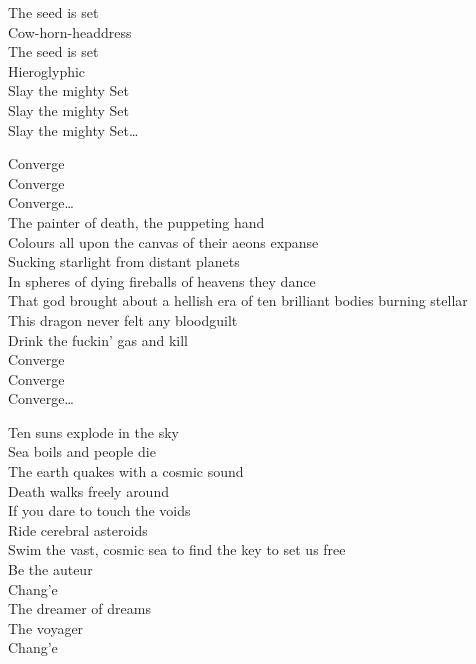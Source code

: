 The seed is set\\
Cow-horn-headdress\\
The seed is set\\
Hieroglyphic\\

Slay the mighty Set\\
Slay the mighty Set\\
Slay the mighty Set…\\


Converge\\
Converge\\
Converge…\\

The painter of death, the puppeting hand\\
Colours all upon the canvas of their aeons expanse\\
Sucking starlight from distant planets\\
In spheres of dying fireballs of heavens they dance\\

That god brought about a hellish era of ten brilliant bodies burning stellar\\
This dragon never felt any bloodguilt\\
Drink the fuckin' gas and kill\\

Converge\\
Converge\\
Converge…\\



Ten suns explode in the sky\\
Sea boils and people die\\
The earth quakes with a cosmic sound\\
Death walks freely around\\
If you dare to touch the voids\\
Ride cerebral asteroids\\
Swim the vast, cosmic sea to find the key to set us free\\

Be the auteur\\
Chang'e\\
The dreamer of dreams\\
The voyager\\
Chang'e\\

